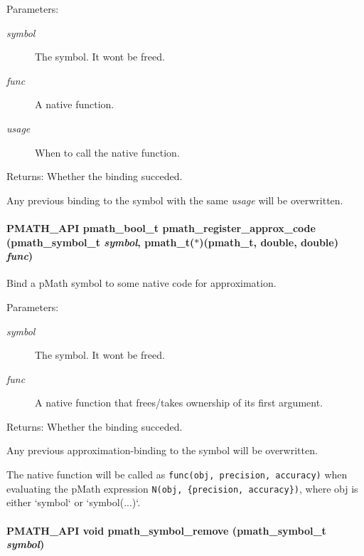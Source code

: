 \begin{Desc}
\item[Parameters:]
\begin{description}
\item[{\em symbol}]The symbol. It wont be freed. \item[{\em func}]A native function. \item[{\em usage}]When to call the native function. \end{description}
\end{Desc}
\begin{Desc}
\item[Returns:]Whether the binding succeded.\end{Desc}
Any previous binding to the symbol with the same {\em usage\/} will be overwritten. \hypertarget{group__symbols_gfb4f09c196d889a710c73d917ea0c12a}{
\paragraph[{pmath\_\-register\_\-approx\_\-code}]{\setlength{\rightskip}{0pt plus 5cm}PMATH\_\-API {\bf pmath\_\-bool\_\-t} pmath\_\-register\_\-approx\_\-code ({\bf pmath\_\-symbol\_\-t} {\em symbol}, \/  {\bf pmath\_\-t}($\ast$)({\bf pmath\_\-t}, double, double) {\em func})}\hfill}
\label{group__symbols_gfb4f09c196d889a710c73d917ea0c12a}


Bind a pMath symbol to some native code for approximation. 

\begin{Desc}
\item[Parameters:]
\begin{description}
\item[{\em symbol}]The symbol. It wont be freed. \item[{\em func}]A native function that frees/takes ownership of its first argument. \end{description}
\end{Desc}
\begin{Desc}
\item[Returns:]Whether the binding succeded.\end{Desc}
Any previous approximation-binding to the symbol will be overwritten.

The native function will be called as {\tt func(obj, precision, accuracy)} when evaluating the pMath expression {\tt N(obj, \{precision, accuracy\})}, where obj is either `symbol` or `symbol(...)`. \hypertarget{group__symbols_g78e6e98a2973c5e2b073b885269b12e4}{
\paragraph[{pmath\_\-symbol\_\-remove}]{\setlength{\rightskip}{0pt plus 5cm}PMATH\_\-API void pmath\_\-symbol\_\-remove ({\bf pmath\_\-symbol\_\-t} {\em symbol})}\hfill}
\label{group__symbols_g78e6e98a2973c5e2b073b885269b12e4}


